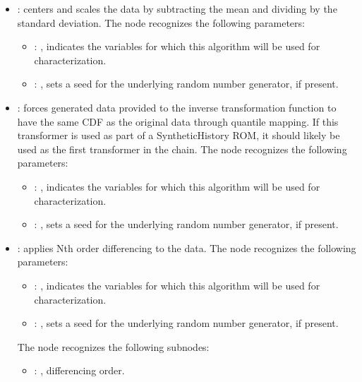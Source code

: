 \begin{itemize}
    \item {}:
      centers and scales the data by subtracting the mean and dividing by     the standard
      deviation.
      The  node recognizes the following parameters:
        \begin{itemize}
          \item {}: , 
            indicates the variables for which this algorithm will be used for characterization.
          \item {}: , 
            sets a seed for the underlying random number generator, if present.
      \end{itemize}

    \item {}:
      forces generated data provided to the inverse transformation function to
      have the same CDF as the original data through quantile mapping. If this
      transformer is used as part of a SyntheticHistory ROM, it should likely
      be used as the first transformer in the chain.
      The  node recognizes the following parameters:
        \begin{itemize}
          \item {}: , 
            indicates the variables for which this algorithm will be used for characterization.
          \item {}: , 
            sets a seed for the underlying random number generator, if present.
      \end{itemize}

    \item {}:
      applies Nth order differencing to the data.
      The  node recognizes the following parameters:
        \begin{itemize}
          \item {}: , 
            indicates the variables for which this algorithm will be used for characterization.
          \item {}: , 
            sets a seed for the underlying random number generator, if present.
      \end{itemize}

      The  node recognizes the following subnodes:
      \begin{itemize}
        \item {}: , 
          differencing order.
      \end{itemize}


\end{itemize}
